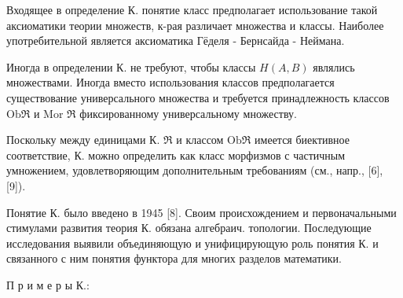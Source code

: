 \documentclass[10pt]{article}
\begin{document}
Входящее в определение К. понятие класс предполагает использование такой аксиоматики теории множеств, к-рая различает множества и классы. Наиболее употребительной является аксиоматика Гёделя - Бернсайда - Неймана.



Иногда в определении К. не требуют, чтобы классы $H(A, B)$ являлись множествами. Иногда вместо использования классов предполагается существование универсального множества и требуется принадлежность классов $\mathrm{Ob} \mathfrak{\Re}$ и Mor $\Re$ фиксированному универсальному множеству.



Поскольку между единицами К. $\mathfrak{\Re}$ и классом $\mathrm{Ob} \mathfrak{R}$ имеется биективное соответствие, К. можно определить как класс морфизмов с частичным умножением, удовлетворяющим дополнительным требованиям (см., напр., [6], [9]).



Понятие К. было введено в 1945 [8]. Своим происхождением и первоначальными стимулами развития теория К. обязана алгебраич. топологии. Последующие исследования выявили объединяющую и унифицирующую роль понятия К. и связанного с ним понятия функтора для многих разделов математики.



П р и м е р ы К.:
\end{document}
